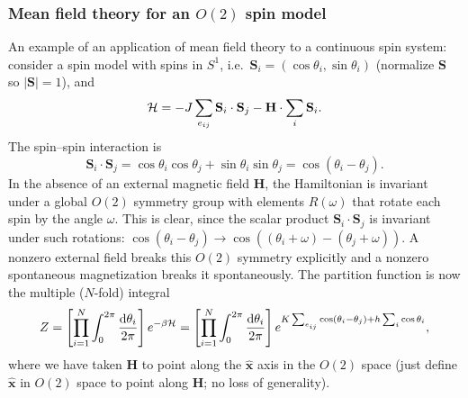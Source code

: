 \subsubsection*{Mean field theory for an \texorpdfstring{$O(2)$}{O(2)} spin model}

An example of an application of mean field theory to a continuous spin system: consider a spin
model with spins in $S^1$, i.e.\ $\mathbf{S}_i = (\cos\theta_i,\sin\theta_i)$ (normalize
$\mathbf{S}$ so $|\mathbf{S}| = 1$), and
\begin{equation}
  \mathcal{H} = -J\sum_{e_{ij}}\mathbf{S}_i\cdot\mathbf{S}_j - \mathbf{H}\cdot\sum_i\mathbf{S}_i .
\end{equation}
The spin--spin interaction is
\begin{equation}
  \mathbf{S}_i\cdot\mathbf{S}_j = \cos\theta_i\cos\theta_j + \sin\theta_i\sin\theta_j = \cos(\theta_i-\theta_j).
\end{equation}
In the absence of an external magnetic field $\mathbf{H}$, the Hamiltonian is invariant under a
global $O(2)$ symmetry group with elements $R(\omega)$ that rotate each spin by the angle $\omega$.
This is clear, since the scalar product $\mathbf{S}_i\cdot\mathbf{S}_j$ is invariant under such
rotations: $\cos(\theta_i-\theta_j)\to\cos((\theta_i+\omega)-(\theta_j+\omega))$. A nonzero external
field breaks this $O(2)$ symmetry explicitly and a nonzero spontaneous magnetization breaks it
spontaneously. The partition function is now the multiple ($N$-fold) integral
\begin{equation}
  Z = \left[\prod_{i=1}^N\int_0^{2\pi}\frac{\mathop{}\!\mathrm{d}\theta_i}{2\pi}\right]e^{-\beta\mathcal{H}}
    = \left[\prod_{i=1}^N\int_0^{2\pi}\frac{\mathop{}\!\mathrm{d}\theta_i}{2\pi}\right]
      e^{K\sum_{e_{ij}}\cos(\theta_i-\theta_j) + h\sum_i\cos\theta_i},
\end{equation}
where we have taken $\mathbf{H}$ to point along the $\hat{\mathbf{x}}$ axis in the $O(2)$ space (just
define $\hat{\mathbf{x}}$ in $O(2)$ space to point along $\mathbf{H}$; no loss of generality).

